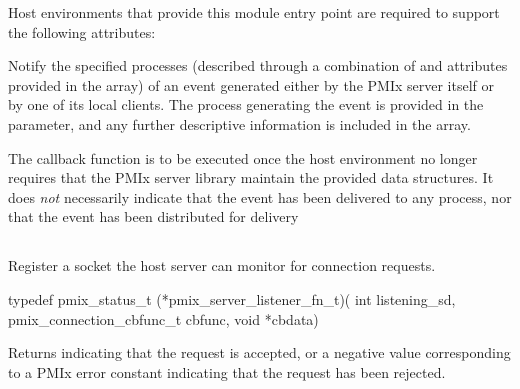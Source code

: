 Host environments that provide this module entry point are required to support the following attributes:


\reqattrend

\descr

Notify the specified processes (described through a combination of  and attributes provided in the  array) of an event generated either by the \ac{PMIx} server itself or by one of its local clients.
The process generating the event is provided in the  parameter, and any further descriptive information is
included in the  array.

\advicermstart
The callback function is to be executed once the host environment no longer requires that the \ac{PMIx} server library maintain the provided data structures. It does \emph{not} necessarily indicate that the event has been delivered to any process, nor that the event has been distributed for delivery
\advicermend


\subsection{}

\summary

Register a socket the host server can monitor for connection requests.

\format

\cspecificstart
\begin{codepar}
typedef pmix_status_t (*pmix_server_listener_fn_t)(
                             int listening_sd,
                             pmix_connection_cbfunc_t cbfunc,
                             void *cbdata)
\end{codepar}
\cspecificend

\begin{arglist}
\end{arglist}

Returns  indicating that the request is accepted, or a negative value corresponding to a PMIx error constant indicating that the request has been rejected.

\descr

